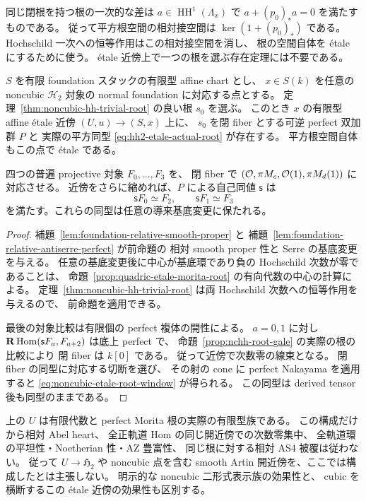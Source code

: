 \begin{remark}
\label{rem:hh2-etale-root-tangent}
同じ閉根を持つ根の一次的な差は
$a\in\operatorname{HH}^1(\Lambda_x)$ で
$a+(p_0)_*a=0$ を満たすものである。
従って平方根空間の相対接空間は
$\ker(1+(p_0)_*)$ である。
Hochschild 一次への恒等作用はこの相対接空間を消し、
根の空間自体を étale にするために使う。
étale 近傍上で一つの根を選ぶ存在定理には不要である。
\end{remark}

\begin{corollary}
\label{cor:noncubic-etale-morita-root}
$S$ を有限 foundation スタックの有限型 affine chart とし、
$x\in S(k)$ を任意の noncubic $\mathcal H_2$ 対象の
normal foundation に対応する点とする。
定理~\ref{thm:noncubic-hh-trivial-root} の良い根 $s_0$ を選ぶ。
このとき $x$ の有限型 affine étale 近傍 $(U,u)\to(S,x)$ 上に、
$s_0$ を閉 fiber とする可逆 perfect 双加群 $P$ と
実際の平方同型 \eqref{eq:hh2-etale-actual-root} が存在する。
平方根空間自体もこの点で étale である。

四つの普遍 projective 対象 $F_0,\ldots,F_3$ を、
閉 fiber で
$(\mathcal O,\pi M_c,\mathcal O(1),\pi M_d(1))$ に対応させる。
近傍をさらに縮めれば、$P$ による自己同値 $\mathsf s$ は
\[
 \mathsf s F_0\simeq F_2,\qquad
 \mathsf s F_1\simeq F_3
 \tag{N-window}\label{eq:noncubic-etale-root-window}
\]
を満たす。これらの同型は任意の導来基底変更に保たれる。
\end{corollary}

\begin{proof}
補題~\ref{lem:foundation-relative-smooth-proper} と
補題~\ref{lem:foundation-relative-antiserre-perfect} が前命題の
相対 smooth proper 性と Serre の基底変更を与える。
任意の基底変更後に中心が基底環であり負の Hochschild 次数が零であることは、
命題~\ref{prop:quadric-etale-morita-root} の有向代数の中心の計算による。
定理~\ref{thm:noncubic-hh-trivial-root} は両 Hochschild 次数への恒等作用を与えるので、
前命題を適用できる。

最後の対象比較は有限個の perfect 複体の開性による。
$a=0,1$ に対し
$\mathbf R\operatorname{Hom}(\mathsf sF_a,F_{a+2})$ は底上 perfect で、
命題~\ref{prop:nchh-root-gale} の実際の根の比較により
閉 fiber は $k[0]$ である。
従って近傍で次数零の線束となる。
閉 fiber の同型に対応する切断を選び、
その射の cone に perfect Nakayama を適用すると
\eqref{eq:noncubic-etale-root-window} が得られる。
この同型は derived tensor 後も同型のままである。
\end{proof}

\begin{remark}[有限型近傍でまだ結論していないこと]
\label{rem:noncubic-etale-root-scope}
上の $U$ は有限代数と perfect Morita 根の実際の有限型族である。
この構成だけから相対 Abel heart、
全正軌道 Hom の同じ開近傍での次数零集中、
全軌道環の平坦性・Noetherian 性・AZ 豊富性、
同じ根に対する相対 AS4 被覆は従わない。
従って $U\to\mathfrak H_2$ や
noncubic 点を含む smooth Artin 開近傍を、ここでは構成したとは主張しない。
明示的な noncubic 二形式表示族の効果性と、
cubic を横断するこの étale 近傍の効果性も区別する。
\end{remark}

